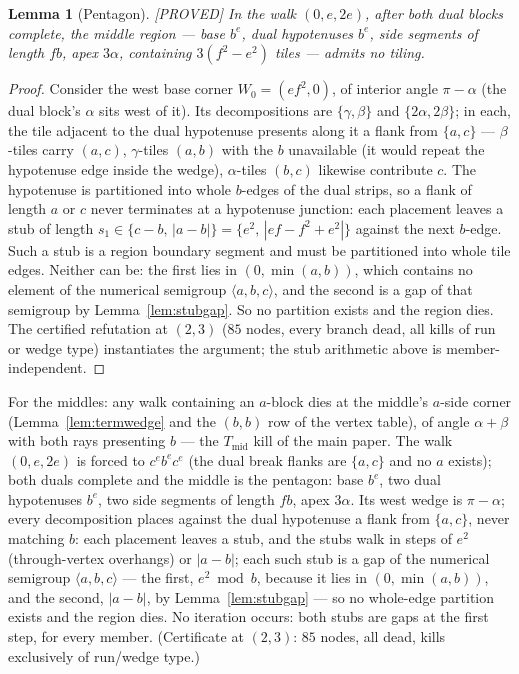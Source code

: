 \documentclass[11pt,reqno]{amsart}
\theoremstyle{plain}
\newtheorem{lemma}[theorem]{Lemma}
\theoremstyle{definition}
\newcommand{\lab}[1]{\hfill\textnormal{\footnotesize\textsc{[#1]}}}
\begin{document}
\begin{lemma}[Pentagon]\label{lem:pentagon}\lab{PROVED}
In the walk $(0,e,2e)$, after both dual blocks complete, the middle region --- base $b^e$, dual
hypotenuses $b^e$, side segments of length $fb$, apex $3\alpha$, containing $3(f^2-e^2)$ tiles ---
admits no tiling.
\end{lemma}
\begin{proof}
Consider the west base corner $W_0=(ef^2,0)$, of interior angle $\pi-\alpha$ (the dual block's
$\alpha$ sits west of it). Its decompositions are $\{\gamma,\beta\}$ and $\{2\alpha,2\beta\}$; in
each, the tile adjacent to the dual hypotenuse presents along it a flank from $\{a,c\}$ ---
$\beta$-tiles carry $(a,c)$, $\gamma$-tiles $(a,b)$ with the $b$ unavailable (it would repeat the
hypotenuse edge inside the wedge), $\alpha$-tiles $(b,c)$ likewise contribute $c$. The hypotenuse
is partitioned into whole $b$-edges of the dual strips, so a flank of length $a$ or $c$ never
terminates at a hypotenuse junction: each placement leaves a stub of length
$s_1\in\{c-b,\,|a-b|\}=\{e^2,\,|ef-f^2+e^2|\}$ against the next $b$-edge. Such a stub is a region
boundary segment and must be partitioned into whole tile edges. Neither can be: the first lies in
$(0,\min(a,b))$, which contains no element of the numerical semigroup $\langle a,b,c\rangle$, and
the second is a gap of that semigroup by Lemma~\ref{lem:stubgap}. So no partition exists and the
region dies. The certified refutation at $(2,3)$ ($85$ nodes, every branch dead, all kills of run or
wedge type) instantiates the argument; the stub arithmetic above is member-independent.
\end{proof} For the middles:
any walk containing an $a$-block dies at the middle's $a$-side corner (Lemma~\ref{lem:termwedge} and the $(b,b)$ row of the vertex table), of angle $\alpha+\beta$
with both rays presenting $b$ --- the $T_{\mathrm{mid}}$ kill of the main paper. The walk
$(0,e,2e)$ is forced to $c^e b^e c^e$ (the dual break flanks are $\{a,c\}$ and no $a$ exists);
both duals complete and the middle is the pentagon: base $b^e$, two dual hypotenuses $b^e$, two
side segments of length $fb$, apex $3\alpha$. Its west wedge is $\pi-\alpha$; every decomposition
places against the dual hypotenuse a flank from $\{a,c\}$, never matching $b$: each placement
leaves a stub, and the stubs walk in steps of $e^2$ (through-vertex overhangs) or $|a-b|$;
each such stub is a gap of the numerical semigroup $\langle a,b,c\rangle$ --- the first,
$e^2 \bmod b$, because it lies in $(0,\min(a,b))$, and the second, $|a-b|$, by
Lemma~\ref{lem:stubgap} --- so no whole-edge partition exists and the region dies. No iteration
occurs: both stubs are gaps at the first step, for every member. (Certificate at
$(2,3)$: $85$ nodes, all dead, kills exclusively of run/wedge type.)
\end{document}
